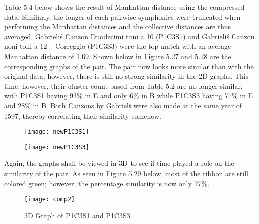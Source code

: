 Table 5.4 below shows the result of Manhattan distance using the compressed data. Similarly, the longer of each pairwise symphonies were truncated when performing the Manhattan distances and the collective distances are thus averaged. Gabrieli\'s Canzon Duodecimi toni a 10 (P1C3S1) and Gabrieli\'s Canzon noni toni a 12 – Correggio (P1C3S3) were the top match with an average Manhattan distance of 1.69. Shown below in Figure 5.27 and 5.28 are the corresponding graphs of the pair. The pair now looks more similar than with the original data; however, there is still no strong similarity in the 2D graphs. This time, however, their cluster count based from Table 5.2 are no longer similar, with P1C3S1 having 93\% in E and only 6\% in B while P1C3S3 having 71\% in E and 28\% in B. Both Canzons by Gabrieli were also made at the same year of 1597, thereby correlating their similarity somehow.

\begin{figure}[H]
\begin{minipage}{.5\textwidth}
  \centering
  \texttt{[image: newP1C3S1]}
  \label{fig:test1}
\end{minipage}
\begin{minipage}{.5\textwidth}
  \centering
  \texttt{[image: newP1C3S3]}
  \label{fig:test2}
\end{minipage}
\end{figure}

Again, the graphs shall be viewed in 3D to see if time played a role on the similarity of the pair. As seen in Figure 5.29 below, most of the ribbon are still colored green; however, the percentage similarity is now only 77\%.

\begin{figure}[H]
\caption{3D Graph of P1C3S1 and P1C3S3}
\centering
\texttt{[image: comp2]}
\end{figure}

